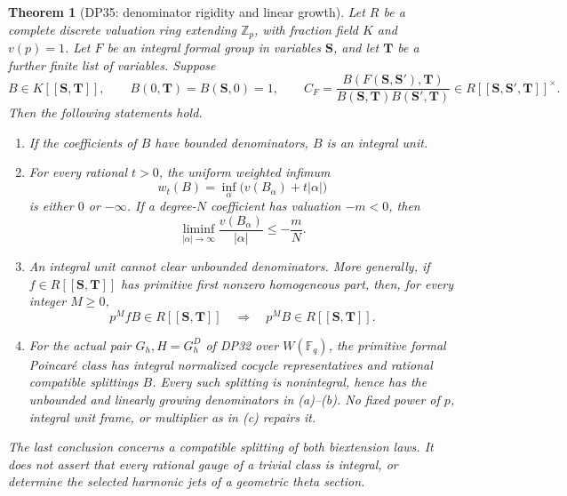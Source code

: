 \documentclass[11pt,a4paper]{article}
\newtheorem{theorem}{Theorem}[section]
\theoremstyle{definition}\newtheorem{remark}[theorem]{Remark}
\newcommand{\Z}{\mathbb Z}\newcommand{\Q}{\mathbb Q}\newcommand{\F}{\mathbb F}
\begin{document}
\begin{theorem}[DP35: denominator rigidity and linear growth]\label{DP35}
Let $R$ be a complete discrete valuation ring extending $\Z_p$, with fraction field $K$ and $v(p)=1$. Let $F$ be an integral formal group in variables $\mathbf S$, and let $\mathbf T$ be a further finite list of variables. Suppose
\[
 B\in K[[\mathbf S,\mathbf T]],\qquad B(0,\mathbf T)=B(\mathbf S,0)=1,
 \qquad C_F=\frac{B(F(\mathbf S,\mathbf S'),\mathbf T)}{B(\mathbf S,\mathbf T)B(\mathbf S',\mathbf T)}
       \in R[[\mathbf S,\mathbf S',\mathbf T]]^\times.
\]
Then the following statements hold.
\begin{enumerate}[leftmargin=*,label=(\alph*)]
\item If the coefficients of $B$ have bounded denominators, $B$ is an integral unit.
\item For every rational $t>0$, the uniform weighted infimum
\[
 w_t(B)=\inf_\alpha\bigl(v(B_\alpha)+t|\alpha|\bigr)
\]
is either $0$ or $-\infty$. If a degree-$N$ coefficient has valuation $-m<0$, then
\[
 \liminf_{|\alpha|\longrightarrow\infty}\frac{v(B_\alpha)}{|\alpha|}\le-\frac mN.
\]
\item An integral unit cannot clear unbounded denominators. More generally, if $f\in R[[\mathbf S,\mathbf T]]$ has primitive first nonzero homogeneous part, then, for every integer $M\ge0$,
\[
 p^M fB\in R[[\mathbf S,\mathbf T]]\quad\Longrightarrow\quad
 p^M B\in R[[\mathbf S,\mathbf T]].
\]
\item For the actual pair $G_h,H=G_h^D$ of DP32 over $W(\F_q)$, the primitive formal Poincar\'e class has integral normalized cocycle representatives and rational compatible splittings $B$. Every such splitting is nonintegral, hence has the unbounded and linearly growing denominators in (a)--(b). No fixed power of $p$, integral unit frame, or multiplier as in (c) repairs it.
\end{enumerate}
The last conclusion concerns a compatible splitting of both biextension laws. It does not assert that every rational gauge of a trivial class is integral, or determine the selected harmonic jets of a geometric theta section.
\end{theorem}
\end{document}

